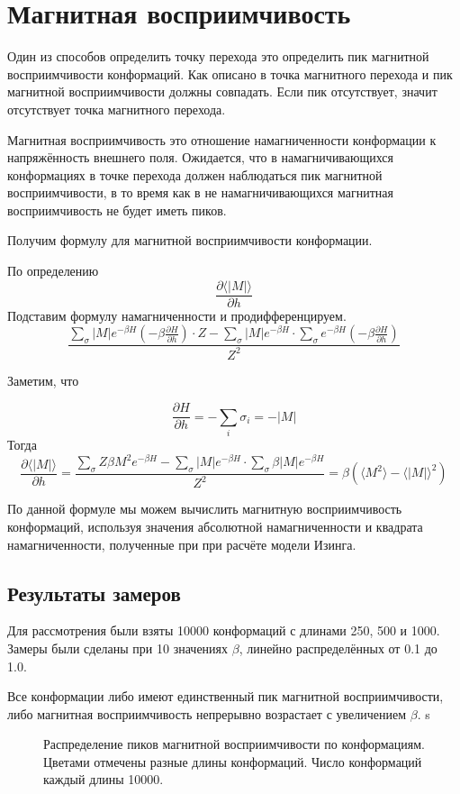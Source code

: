 \section{Магнитная восприимчивость}
Один из способов определить точку перехода это определить пик магнитной восприимчивости конформаций. Как описано в \cite{swendsen} точка магнитного перехода и пик магнитной восприимчивости должны совпадать. Если пик отсутствует, значит отсутствует точка магнитного перехода.

Магнитная восприимчивость это отношение намагниченности конформации к напряжённость внешнего поля. Ожидается, что в намагничивающихся конформациях в точке перехода должен наблюдаться пик магнитной восприимчивости, в то время как в не намагничивающихся магнитная восприимчивость не будет иметь пиков.

Получим формулу для магнитной восприимчивости конформации.

По определению
\[
\frac{\partial\langle |M|\rangle}{\partial h}
\]
Подставим формулу намагниченности и продифференцируем.
\[
\frac{\sum_\sigma {|M| e^{-\beta H} \left( -\beta \frac{\partial H}{\partial h}\right)} \cdot Z - \sum_\sigma {|M| e^{-\beta H}} \cdot \sum_\sigma {e^{-\beta H} \left( -\beta \frac{\partial H}{\partial h}\right)}}{Z^2}
\] 

Заметим, что 

\[
\frac{\partial H}{\partial h} = -\sum_i\sigma_i = -|M|
\]
Тогда
\[
\frac{\partial\langle |M|\rangle}{\partial h} = \frac{\sum_\sigma {Z\beta M^2 e^{-\beta H}} - \sum_\sigma {|M| e^{-\beta H}}\cdot \sum_\sigma {\beta |M| e^{-\beta H}}}{Z^2} = \beta \left(\langle M^2\rangle - \langle |M| \rangle^2 \right)
\]


По данной формуле мы можем вычислить магнитную восприимчивость конформаций, используя значения абсолютной намагниченности и квадрата намагниченности, полученные при при расчёте модели Изинга.



\subsection{Результаты замеров}
Для рассмотрения были взяты 10000 конформаций с длинами 250, 500 и 1000. Замеры были сделаны при 10 значениях $\beta$, линейно распределённых от 0.1 до 1.0. 

Все конформации либо имеют единственный пик магнитной восприимчивости, либо магнитная восприимчивость непрерывно возрастает с увеличением $\beta$.
s
\begin{figure}[htb]
	\centering	
	
	\caption{Распределение пиков магнитной восприимчивости по конформациям. Цветами отмечены разные длины конформаций. Число конформаций каждый длины 10000. }
	\label{fig:ms_peaks}
\end{figure}


